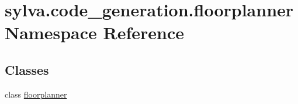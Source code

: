 \hypertarget{namespacesylva_1_1code__generation_1_1floorplanner}{}\section{sylva.\+code\+\_\+generation.\+floorplanner Namespace Reference}
\label{namespacesylva_1_1code__generation_1_1floorplanner}
\subsection*{Classes}
\begin{DoxyCompactItemize}
\item 
class \hyperlink{classsylva_1_1code__generation_1_1floorplanner_1_1floorplanner}{floorplanner}
\end{DoxyCompactItemize}
